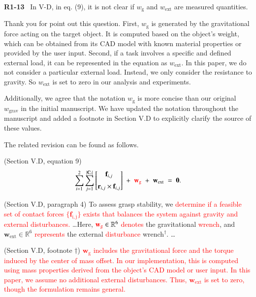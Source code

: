\documentclass[journal]{IEEEtran}
\newcommand{\rev}[1]{\textcolor{red}{#1}}
\begin{document}
\noindent
{\textbf{\color{black}R1-13}\color{gray}~
In V-D, in eq. (9), it is not clear if $w_\mathrm{g}$ and $w_\mathrm{ext}$ are measured quantities.
}

Thank you for point out this question. First, $w_\mathrm{g}$ is generated by the gravitational force acting on the target object. It is computed based on the object’s weight, which can be obtained from its CAD model with known material properties or provided by the user input. Second, if a task involves a specific and defined external load, it can be represented in the equation as $w_\mathrm{ext}$. In this paper, we do not consider a particular external load. Instead, we only consider the resistance to gravity. So $w_\mathrm{ext}$ is set to zero in our analysis and experiments.

Additionally, we agree that the notation $w_\mathrm{g}$ is more concise than our original $w_\mathrm{grav}$ in the initial manuscript. We have updated the notation throughout the manuscript and added a footnote in Section V.D to explicitly clarify the source of these values.

The related revision can be found as follows.

(Section V.D, equation 9)
\begin{equation}
    \sum_{i=1}^2 \sum_{j=1}^{|\mathbf{C}_i|}
\begin{bmatrix}
\mathbf{f}_{i,j} \\[6pt]
\mathbf{r}_{i,j} \times \mathbf{f}_{i,j}
\end{bmatrix}
\;+\;
\rev{\mathbf{w}_{\mathrm{g}}}
\;+\;
\mathbf{w}_{\mathrm{ext}}
\;=\;
\mathbf{0}. \nonumber
\end{equation}

(Section V.D, paragraph 4) To assess grasp stability, we \rev{determine if a feasible set of contact forces $\{\mathbf{f}_\mathrm{i,j}\}$ exists that balances the system against gravity and external disturbances.} \ldots Here,  $\rev{\mathbf{w}_\mathrm{g}}\in\mathbb{R}^6$ \rev{denotes} the gravitational \rev{wrench}, and $\mathbf{w}_\mathrm{ext}\in\mathbb{R}^6$ \rev{represents} the external \rev{disturbance} wrench$^\dagger$. \ldots

(Section V.D, footnote $\dagger$) 
\rev{$\mathbf{w}_\mathrm{g}$ includes the gravitational force and the torque induced by the center of mass offset. In our implementation, this is computed using mass properties derived from the object's CAD model or user input. In this paper, we assume no additional external disturbances. Thus, $\mathbf{w}_\mathrm{ext}$  is set to zero, though the formulation remains general.} \\
\end{document}
